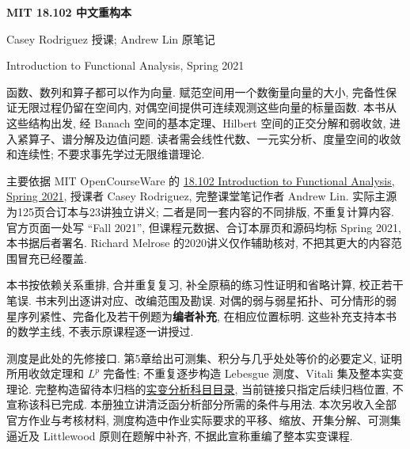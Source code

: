 \frontmatter
\begin{center}
{\color{structurecolor}\bfseries\fontsize{18}{25}\selectfont\BookTitle\par}
{\bfseries MIT 18.102 中文重构本\par}
Casey Rodriguez 授课; Andrew Lin 原笔记\par
Introduction to Functional Analysis, Spring 2021\par
\end{center}
\originalpreface
函数、数列和算子都可以作为向量. 赋范空间用一个数衡量向量的大小, 完备性保证无限过程仍留在空间内, 对偶空间提供可连续观测这些向量的标量函数. 本书从这些结构出发, 经 Banach 空间的基本定理、Hilbert 空间的正交分解和弱收敛, 进入紧算子、谱分解及边值问题. 读者需会线性代数、一元实分析、度量空间的收敛和连续性; 不要求事先学过无限维谱理论.

主要依据 MIT OpenCourseWare 的 \href{https://ocw.mit.edu/courses/18-102-introduction-to-functional-analysis-spring-2021/pages/lecture-notes-and-readings/}{18.102 Introduction to Functional Analysis, Spring 2021}, 授课者 Casey Rodriguez, 完整课堂笔记作者 Andrew Lin. 实际主源为125页合订本与23讲独立讲义; 二者是同一套内容的不同排版, 不重复计算内容. 官方页面一处写 ``Fall 2021'', 但课程元数据、合订本扉页和源码均标 Spring 2021, 本书据后者署名. Richard Melrose 的2020讲义仅作辅助核对, 不把其更大的内容范围冒充已经覆盖.

本书按依赖关系重排, 合并重复复习, 补全原稿的练习性证明和省略计算, 校正若干笔误. 书末列出逐讲对应、改编范围及勘误. 对偶的弱与弱星拓扑、可分情形的弱星序列紧性、完备化及若干例题为\textbf{编者补充}, 在相应位置标明. 这些补充支持本书的数学主线, 不表示原课程逐一讲授过.

测度是此处的先修接口. 第5章给出可测集、积分与几乎处处等价的必要定义, 证明所用收敛定理和 $L^p$ 完备性; 不重复逐步构造 Lebesgue 测度、Vitali 集及整本实变理论. 完整构造留待本归档的\href{https://github.com/xhc144/mit-ocw-notes/tree/main/subjects/real-analysis}{实变分析科目目录}, 当前链接只指定后续归档位置, 不宣称该科已完成. 本册独立讲清泛函分析部分所需的条件与用法. 本次另收入全部官方作业与考核材料, 测度构造中作业实际要求的平移、缩放、开集分解、可测集逼近及 Littlewood 原则在题解中补齐, 不据此宣称重编了整本实变课程.

